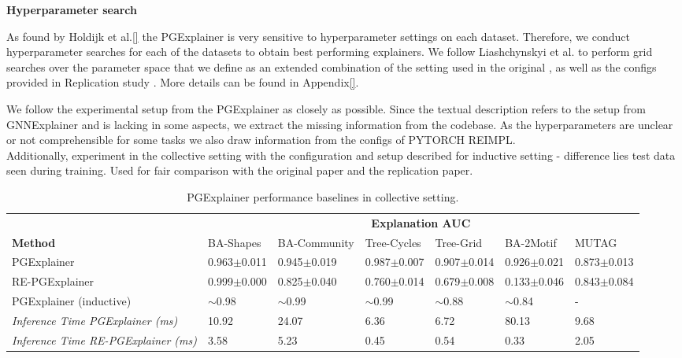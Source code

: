 \textbf{Hyperparameter search}

As found by Holdijk et al.\ref{} the PGExplainer is very sensitive to hyperparameter settings on each dataset. Therefore, we conduct hyperparameter searches for each of the datasets to obtain best performing explainers. We follow Liashchynskyi et al. \cite{liashchynskyi2019grid} to perform grid searches over the parameter space that we define as an extended combination of the setting used in the original \cite{}, as well as the configs provided in Replication study \cite{}. More details can be found in Appendix\ref{}.




We follow the experimental setup from the PGExplainer as closely as possible. Since the textual description refers to the setup from GNNExplainer and is lacking in some aspects, we extract the missing information from the codebase. As the hyperparameters are unclear or not comprehensible for some tasks we also draw information from the configs of PYTORCH REIMPL. \\



Additionally, experiment in the collective setting with the configuration and setup described for inductive setting - difference lies test data seen during training. Used for fair comparison with the original paper and the replication paper.

\begin{table}[ht]
    \centering
    \scriptsize
    \begin{tabularx}{\textwidth}{l*{6}{X}}   %
    \toprule
    \textbf{} & \multicolumn{6}{c}{\textbf{Explanation AUC}} \\
    \cmidrule{2-7}
    \textbf{Method} & BA-Shapes & BA-Community & Tree-Cycles & Tree-Grid & BA-2Motif & MUTAG \\
    \midrule
    PGExplainer & 0.963$\pm$0.011 & 0.945$\pm$0.019 & 0.987$\pm$0.007 & 0.907$\pm$0.014 & 0.926$\pm$0.021 & 0.873$\pm$0.013 \\
    \midrule
    RE-PGExplainer & 0.999$\pm$0.000 & 0.825$\pm$0.040 & 0.760$\pm$0.014 & 0.679$\pm$0.008 & 0.133$\pm$0.046 & 0.843$\pm$0.084 \\
    \midrule
    PGExplainer (inductive) & $\sim$0.98 & $\sim$0.99 & $\sim$0.99 & $\sim$0.88 & $\sim$0.84 & - \\
    \midrule
    \textit{Inference Time PGExplainer (ms)} & 10.92 & 24.07 & 6.36 & 6.72 & 80.13 & 9.68 \\
    \textit{Inference Time RE-PGExplainer (ms)} & 3.58 & 5.23 & 0.45 & 0.54 & 0.33 & 2.05 \\
    \bottomrule
    \end{tabularx}
    \caption{PGExplainer performance baselines in collective setting.}
    \label{tab:pgexplainer_auc}
\end{table}

